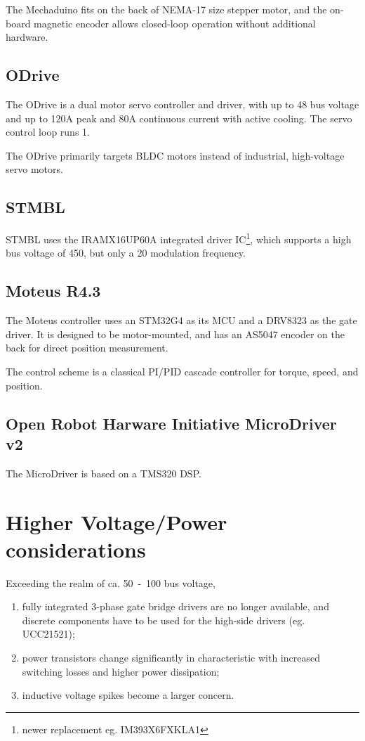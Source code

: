 \documentclass[12pt,a4paper,oneside,openany]{article}
\begin{document}
The Mechaduino fits on the back of NEMA-17 size stepper motor, and the on-board magnetic encoder allows closed-loop operation without additional hardware.

\subsection{ODrive}

The ODrive is a dual motor servo controller and driver, with up to \unit{48}{\volt} bus voltage and up to \unit{120}{A} peak and \unit{80}{A} continuous current with active cooling. The servo control loop runs \unit{1}{\kilo\hertz}.

The ODrive primarily targets BLDC motors instead of industrial, high-voltage servo motors.

\subsection{STMBL}

STMBL uses the IRAMX16UP60A integrated driver IC\footnote{newer replacement eg. IM393X6FXKLA1}, which supports a high bus voltage of \unit{450}{\volt}, but only a \unit{20}{\kilo\hertz} modulation frequency.

\subsection{Moteus R4.3}

The Moteus controller uses an STM32G4 as its MCU and a DRV8323 as the gate driver. It is designed to be motor-mounted, and has an AS5047 encoder on the back for direct position measurement.

The control scheme is a classical PI/PID cascade controller for torque, speed, and position. 

\subsection{Open Robot Harware Initiative MicroDriver v2}

The MicroDriver is based on a TMS320 DSP.

\section{Higher Voltage/Power considerations}

Exceeding the realm of ca. \unit{50-100}{\volt} bus voltage, 
\begin{enumerate}
\item fully integrated 3-phase gate bridge drivers are no longer available, and discrete components have to be used for the high-side drivers (eg. UCC21521);
\item power transistors change significantly in characteristic with increased switching losses and higher power dissipation;
\item inductive voltage spikes become a larger concern.
\end{enumerate}



\nocite{*}

%
%
\printbibliography
\end{document}
